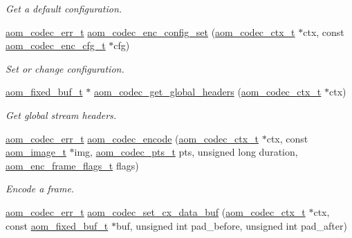\begin{DoxyCompactItemize}
\begin{DoxyCompactList}\small\item\em Get a default configuration. \end{DoxyCompactList}\item 
\hyperlink{group__codec_gaaae61e0f8663e6137f1e228757248e7c}{aom\+\_\+codec\+\_\+err\+\_\+t} \hyperlink{group__encoder_gaf4a4c3c3c91dd92c960990f6e534271d}{aom\+\_\+codec\+\_\+enc\+\_\+config\+\_\+set} (\hyperlink{group__codec_ga9a1d27f9742d9f70783e3c6cb849b5b4}{aom\+\_\+codec\+\_\+ctx\+\_\+t} $\ast$ctx, const \hyperlink{group__encoder_gab9627d5dcf858b7e755a5fc4a879e451}{aom\+\_\+codec\+\_\+enc\+\_\+cfg\+\_\+t} $\ast$cfg)
\begin{DoxyCompactList}\small\item\em Set or change configuration. \end{DoxyCompactList}\item 
\hyperlink{group__encoder_ga85cca9fad6bc25c667f013a39c607174}{aom\+\_\+fixed\+\_\+buf\+\_\+t} $\ast$ \hyperlink{group__encoder_gaa444a90b9ffdc2878686ac5bc83b50ff}{aom\+\_\+codec\+\_\+get\+\_\+global\+\_\+headers} (\hyperlink{group__codec_ga9a1d27f9742d9f70783e3c6cb849b5b4}{aom\+\_\+codec\+\_\+ctx\+\_\+t} $\ast$ctx)
\begin{DoxyCompactList}\small\item\em Get global stream headers. \end{DoxyCompactList}\item 
\hyperlink{group__codec_gaaae61e0f8663e6137f1e228757248e7c}{aom\+\_\+codec\+\_\+err\+\_\+t} \hyperlink{group__encoder_ga6f4a777de5389771e783df7ff1f116d4}{aom\+\_\+codec\+\_\+encode} (\hyperlink{group__codec_ga9a1d27f9742d9f70783e3c6cb849b5b4}{aom\+\_\+codec\+\_\+ctx\+\_\+t} $\ast$ctx, const \hyperlink{aom__image_8h_a5409ae8fdb326fe1cc32622ef4e23748}{aom\+\_\+image\+\_\+t} $\ast$img, \hyperlink{group__encoder_ga958524226c9a65251c9e4f7bb78fc606}{aom\+\_\+codec\+\_\+pts\+\_\+t} pts, unsigned long duration, \hyperlink{group__encoder_gacbef92200b831adb94283f84128f83de}{aom\+\_\+enc\+\_\+frame\+\_\+flags\+\_\+t} flags)
\begin{DoxyCompactList}\small\item\em Encode a frame. \end{DoxyCompactList}\item 
\hyperlink{group__codec_gaaae61e0f8663e6137f1e228757248e7c}{aom\+\_\+codec\+\_\+err\+\_\+t} \hyperlink{group__encoder_ga67b338974dd0a21cefec71d152dd5f51}{aom\+\_\+codec\+\_\+set\+\_\+cx\+\_\+data\+\_\+buf} (\hyperlink{group__codec_ga9a1d27f9742d9f70783e3c6cb849b5b4}{aom\+\_\+codec\+\_\+ctx\+\_\+t} $\ast$ctx, const \hyperlink{group__encoder_ga85cca9fad6bc25c667f013a39c607174}{aom\+\_\+fixed\+\_\+buf\+\_\+t} $\ast$buf, unsigned int pad\+\_\+before, unsigned int pad\+\_\+after)

\end{DoxyCompactItemize}
